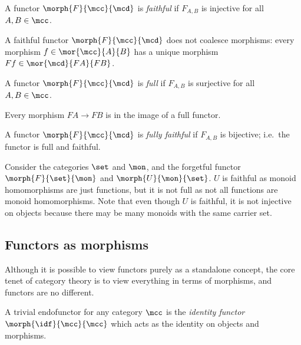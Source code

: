 \begin{definition}
    A functor \(\morph{F}{\mcc}{\mcd}\) is \emph{faithful} if \(F_{A,B}\) is
    injective for all \(A,B \in \mcc\).
\end{definition}

A faithful functor \(\morph{F}{\mcc}{\mcd}\) does not coalesce morphisms: every
morphism \(f \in \mor{\mcc}{A}{B}\) has a unique morphism
\(Ff \in \mor{\mcd}{FA}{FB}\).

\begin{definition}
    A functor \(\morph{F}{\mcc}{\mcd}\) is \emph{full} if \(F_{A,B}\) is
    surjective for all \(A,B \in \mcc\).
\end{definition}

Every morphism \(FA \to FB\) is in the image of a full functor.

\begin{definition}
    A functor \(\morph{F}{\mcc}{\mcd}\) is \emph{fully faithful} if \(F_{A,B}\)
    is bijective; i.e.\ the functor is full and faithful.
\end{definition}

\begin{example}
    Consider the categories \(\set\) and \(\mon\), and the forgetful functor
    \(\morph{F}{\set}{\mon}\) and \(\morph{U}{\mon}{\set}\).
    \(U\) is faithful as monoid homomorphisms are just functions, but it is not
    full as not all functions are monoid homomorphisms.
    Note that even though \(U\) is faithful, it is not injective on objects
    because there may be many monoids with the same carrier set.
\end{example}

\subsection{Functors as morphisms}

Although it is possible to view functors purely as a standalone concept, the
core tenet of category theory is to view everything in terms of morphisms, and
functors are no different.

\begin{example}
    A trivial endofunctor for any category \(\mcc\) is the
    \emph{identity functor} \(\morph{\idf}{\mcc}{\mcc}\) which acts as the
    identity on objects and morphisms.
\end{example}

